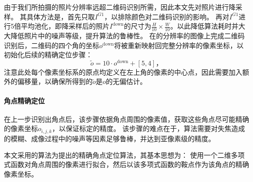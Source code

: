 \def\Idown{I^\mathrm{down}}
\def\odown{o^\mathrm{down}}

由于我们所拍摄的照片分辨率远超二维码识别所需，因此本文先对照片进行降采样。
其具体方法是，首先只取$I^{G1}$，以排除颜色对二维码识别的影响。
再对$I^{G1}$进行5倍平均池化，即降采样后的照片$\Idown$的尺寸为$\frac{H}{10}\times \frac{W}{10}$。以此降低算法耗时并大大降低照片中的噪声等级，提升算法的鲁棒性。
在的分辨率的图像上完成二维码识别后，二维码的四个角的坐标$\odown$将被重新映射回完整分辨率的像素坐标，以初始化后续的精确定位步骤：
\begin{equation}
    \tilde{o} = 10 \cdot \odown + [5,4]
    \text{，}
\end{equation}
注意此处每个像素坐标系的原点均定义在左上角的像素的中心点，因此需要加入额外的偏移量，以确保所得到的$\tilde{o}$是$o$的无偏估计。


\paragraph{角点精确定位}在上一步识别出角点后，该步骤依据角点周围的像素值，获取这些角点尽可能精确的像素坐标$o_{i,j,k}$，以保证标定的精度。
该步骤的难点在于，算法需要对失焦造成的模糊、成像过程中的噪声等因素足够鲁棒，并达到亚像素级的精度。

本文采用的算法为\citet{ROCHADE}提出的精确角点定位算法，其基本思想为：
使用一个二维多项式函数对角点周围的像素进行拟合，然后以该多项式函数的鞍点作为该角点的精确像素坐标。

